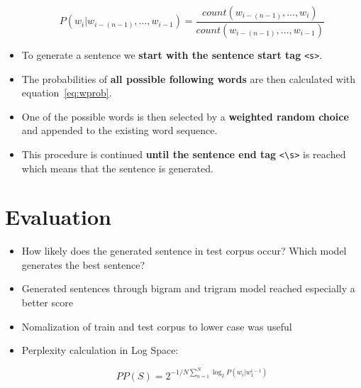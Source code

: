 \documentclass[a0,boxedsections,landscape]{sciposter}
\begin{document}
\begin{multicols}{3}
\begin{itemize}
    \begin{equation}
    \label{eq:wprob}
        P(w_i|w_{i-(n-1)},\dots,w_{i-1}) = \frac{count(w_{i-(n-1)},\dots,w_{i})}{count(w_{i-(n-1)},\dots,w_{i-1})}
    \end{equation}
    
    \item To generate a sentence we \textbf{start with the sentence start tag} \verb+<s>+.
    
    \item The probabilities of \textbf{all possible following words} are then calculated with equation~\ref{eq:wprob}.
    
    \item One of the possible words is then selected by a \textbf{weighted random choice} and appended to the existing word sequence.
    
    \item This procedure is continued \textbf{until the sentence end tag} \verb+<\s>+ is reached which means that the sentence is generated.

\end{itemize}


\section{Evaluation}
\label{sec:evaluation}

\begin{itemize}
    \item How likely does the generated sentence in test corpus occur? Which model generates the best sentence?
    \item Generated sentences through bigram and trigram model reached especially a better score
    \item Nomalization of train and test corpus to lower case was useful
    \item Perplexity calculation in Log Space:
    
    \begin{equation}
        PP(S) = 2^{-1/N\sum_{n=1}^{N}\log_2P(w_i|w_1^{i-1})}
    \end{equation}
    

\end{itemize}
\end{multicols}
\end{document}
